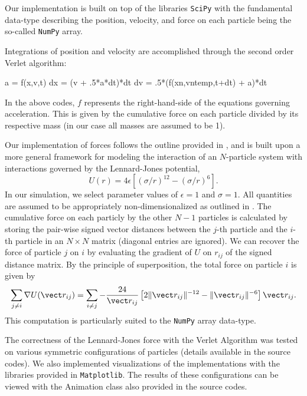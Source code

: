 \documentclass[12pt]{amsart}
\begin{document}
Our implementation is built on top of the libraries \texttt{SciPy} \cite{scipy}
with the fundamental data-type describing the position, velocity, and force on
each particle being the so-called \texttt{NumPy} array.  

Integrations of position and velocity are accomplished through the second order Verlet algorithm:
\begin{python}
  a = f(x,v,t)
  dx = (v + .5*a*dt)*dt
  dv = .5*(f(xn,vntemp,t+dt) + a)*dt  
\end{python}
In the above codes, $f$ represents the right-hand-side of the equations governing acceleration.  This is given by the cumulative force on each particle divided by its respective mass (in our case all masses are assumed to be 1).

 Our implementation of forces follows the outline provided in
\cite{gould}, and is built upon a more general framework for modeling the
interaction of an $N$-particle system with interactions governed by the Lennard-Jones potential\cite{ringlein},
$$
  U(r) = 4\epsilon[(\sigma/r)^{12} - (\sigma/r)^6].
$$
In our simulation, we select parameter values of $\epsilon=1$ and $\sigma=1$.
All quantities are assumed to be appropriately non-dimensionalized as outlined
in \cite{ringlein}.  The cumulative force on each particly by the other $N-1$
particles is calculated by storing the pair-wise signed vector distances
between the $j$-th particle and the $i$-th particle in an $N\times N$ matrix (diagonal entries are ignored).  We can recover the force of
particle $j$ on $i$ by evaluating the gradient of $U$ on $r_{ij}$ of the signed
distance matrix.  By the principle of superposition, the total force on
particle $i$ is given by 
$$
  \sum_{j\not=i} \nabla U( \vect r_{ij} ) = \sum_{i\not=j} -\frac{24}{\vect r_{ij}} \left[2\|\vect r_{ij}\|^{-12} - \|\vect r_{ij}\|^{-6}\right]\vect r_{ij}.
$$ 
This computation is particularly suited to the \texttt{NumPy} array data-type.

The correctness of the Lennard-Jones force with the Verlet Algorithm was tested
on various symmetric configurations of particles (details available in the source codes).  We also implemented
visualizations of the implementations with the libraries provided in
\texttt{Matplotlib}. The results of these configurations can be viewed with the
Animation class also provided in the source codes.  
\end{document}
